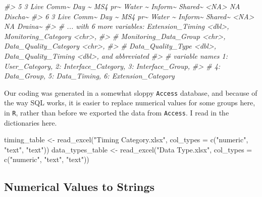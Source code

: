 \documentclass[
]{article}
\newenvironment{Shaded}{\begin{snugshade}}{\end{snugshade}}
\newcommand{\AttributeTok}[1]{\textcolor[rgb]{0.77,0.63,0.00}{#1}}
\newcommand{\CommentTok}[1]{\textcolor[rgb]{0.56,0.35,0.01}{\textit{#1}}}
\newcommand{\FunctionTok}[1]{\textcolor[rgb]{0.00,0.00,0.00}{#1}}
\newcommand{\NormalTok}[1]{#1}
\newcommand{\OtherTok}[1]{\textcolor[rgb]{0.56,0.35,0.01}{#1}}
\newcommand{\StringTok}[1]{\textcolor[rgb]{0.31,0.60,0.02}{#1}}
\begin{document}
\begin{Shaded}
\begin{Highlighting}[]
\CommentTok{\#\textgreater{} 5     3 Live Comm\textasciitilde{} Day \textasciitilde{} MS4 pr\textasciitilde{} Water \textasciitilde{} Inform\textasciitilde{} Shared\textasciitilde{} \textless{}NA\textgreater{}         NA Discha\textasciitilde{}}
\CommentTok{\#\textgreater{} 6     3 Live Comm\textasciitilde{} Day \textasciitilde{} MS4 pr\textasciitilde{} Water \textasciitilde{} Inform\textasciitilde{} Shared\textasciitilde{} \textless{}NA\textgreater{}         NA Draina\textasciitilde{}}
\CommentTok{\#\textgreater{} \# ... with 6 more variables: Extension\_Timing \textless{}dbl\textgreater{}, Monitoring\_Category \textless{}chr\textgreater{},}
\CommentTok{\#\textgreater{} \#   Monitoring\_Data\_Group \textless{}chr\textgreater{}, Data\_Quality\_Category \textless{}chr\textgreater{},}
\CommentTok{\#\textgreater{} \#   Data\_Quality\_Type \textless{}dbl\textgreater{}, Data\_Quality\_Timing \textless{}dbl\textgreater{}, and abbreviated}
\CommentTok{\#\textgreater{} \#   variable names 1: User\_Category, 2: Interface\_Category, 3: Interface\_Group,}
\CommentTok{\#\textgreater{} \#   4: Data\_Group, 5: Data\_Timing, 6: Extension\_Category}
\end{Highlighting}
\end{Shaded}

Our coding was generated in a somewhat sloppy \texttt{Access} database,
and because of the way SQL works, it is easier to replace numerical
values for some groups here, in \texttt{R}, rather than before we
exported the data from \texttt{Access}. I read in the dictionaries here.

\begin{Shaded}
\begin{Highlighting}[]
\NormalTok{timing\_table }\OtherTok{\textless{}{-}} \FunctionTok{read\_excel}\NormalTok{(}\StringTok{"Timing Category.xlsx"}\NormalTok{, }
    \AttributeTok{col\_types =} \FunctionTok{c}\NormalTok{(}\StringTok{"numeric"}\NormalTok{, }\StringTok{"text"}\NormalTok{, }\StringTok{"text"}\NormalTok{))}
\NormalTok{data\_types\_table }\OtherTok{\textless{}{-}} \FunctionTok{read\_excel}\NormalTok{(}\StringTok{"Data Type.xlsx"}\NormalTok{, }
    \AttributeTok{col\_types =} \FunctionTok{c}\NormalTok{(}\StringTok{"numeric"}\NormalTok{, }\StringTok{"text"}\NormalTok{, }\StringTok{"text"}\NormalTok{))}
\end{Highlighting}
\end{Shaded}

\hypertarget{numerical-values-to-strings}{%
\subsection{Numerical Values to
Strings}\label{numerical-values-to-strings}}
\end{document}
